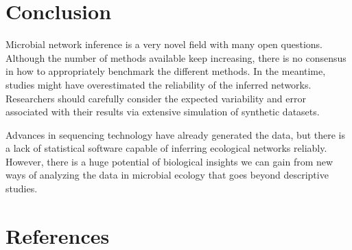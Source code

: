 \documentclass[
  a4paper,
]{article}
\begin{document}
\hypertarget{conclusion}{%
\section{Conclusion}\label{conclusion}}

Microbial network inference is a very novel field with many open
questions. Although the number of methods available keep increasing,
there is no consensus in how to appropriately benchmark the different
methods. In the meantime, studies might have overestimated the
reliability of the inferred networks. Researchers should carefully
consider the expected variability and error associated with their
results via extensive simulation of synthetic datasets.

Advances in sequencing technology have already generated the data, but
there is a lack of statistical software capable of inferring ecological
networks reliably. However, there is a huge potential of biological
insights we can gain from new ways of analyzing the data in microbial
ecology that goes beyond descriptive studies.

\newpage

\hypertarget{references}{%
\section*{References}\label{references}}
\end{document}
